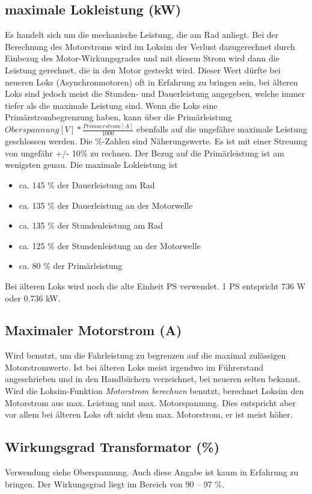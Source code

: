 \subsection{maximale Lokleistung (kW)}
Es handelt sich um die mechanische Leistung, die am Rad anliegt. Bei der Berechnung des Motorstroms wird im Loksim der Verlust dazugerechnet durch Einbezug des Motor-Wirkungsgrades und mit diesem Strom wird dann die Leistung gerechnet, die in den Motor gesteckt wird.
Dieser Wert dürfte bei neueren Loks (Asynchronmotoren) oft in Erfahrung zu bringen sein, bei älteren Loks sind jedoch meist die Stunden- und Dauerleistung angegeben, welche immer tiefer als die maximale Leistung sind. Wenn die Loks eine Primärstrombegrenzung haben, kann über die Primärleistung $Oberspannung [V] * \frac{Primaerstrom [A]}{1000}$ ebenfalls auf die ungefähre maximale Leistung geschlossen werden. Die \%-Zahlen sind Näherungswerte. Es ist mit einer Streuung von ungefähr +/- 10\% zu rechnen. Der Bezug auf die Primärleistung ist am wenigsten genau.
Die maximale Lokleistung ist
\begin{itemize}
\item ca. 145 \% der Dauerleistung am Rad
\item ca. 135 \% der Dauerleistung an der Motorwelle
\item ca. 135 \% der Stundenleistung am Rad
\item ca. 125 \% der Stundenleistung an der Motorwelle
\item ca.   80 \% der Primärleistung
\end{itemize}
Bei älteren Loks wird noch die alte Einheit PS verwendet. 1 PS entspricht 736 W oder 0.736 kW.

\subsection{Maximaler Motorstrom (A)}
Wird benutzt, um die Fahrleistung zu begrenzen auf die maximal zulässigen Motorstromwerte. 
Ist bei älteren Loks meist irgendwo im Führerstand angeschrieben und in den Handbüchern verzeichnet, bei neueren selten bekannt.
Wird die Loksim-Funktion \emph{Motorstrom berechnen} benutzt, berechnet Loksim den Motorstrom aus max. Leistung und max. Motorspannung. Dies entspricht aber vor allem bei älteren Loks oft nicht dem max. Motorstrom, er ist meist höher.

\subsection{Wirkungsgrad Transformator (\%)}
Verwendung siehe Oberspannung.
Auch diese Angabe ist kaum in Erfahrung zu bringen. Der Wirkungsgrad liegt im Bereich von 90 – 97 \%.


